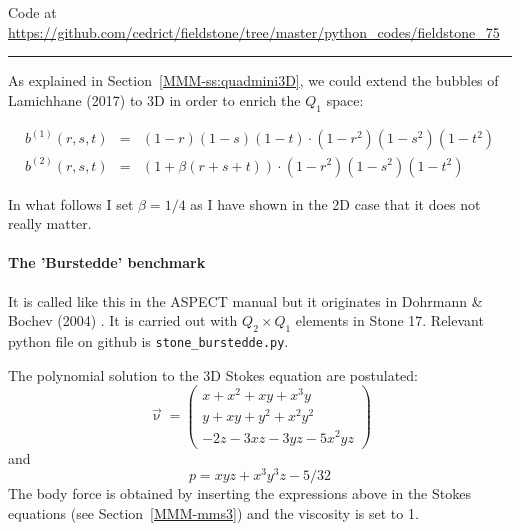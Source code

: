 

\begin{center}
Code at \url{https://github.com/cedrict/fieldstone/tree/master/python_codes/fieldstone_75}
\end{center}

\par\noindent\rule{\textwidth}{0.4pt}


As explained in Section~\ref{MMM-ss:quadmini3D}, we could extend the bubbles 
of Lamichhane (2017) \cite{lami17} to 3D in order to enrich the $Q_1$ space:

\begin{eqnarray}
b^{(1)} (r,s,t) &=& (1-r)(1-s)(1-t) \cdot (1-r^2) (1-s^2) (1-t^2) \\
b^{(2)} (r,s,t) &=& (1 + \beta(r+s+t)) \cdot (1-r^2) (1-s^2) (1-t^2) 
\end{eqnarray}

In what follows I set $\beta=1/4$ as I have shown in the 2D case that it does not really matter. 

\paragraph{The 'Burstedde' benchmark} It is called like this in the ASPECT manual 
but it originates in Dohrmann \& Bochev (2004) \cite{dobo04}. It is carried 
out with $Q_2 \times Q_1$ elements in Stone 17. 
Relevant python file on github is {\tt stone\_burstedde.py}.

The polynomial solution to the 3D Stokes equation are postulated:
\begin{equation}
\vec{\upnu}
=
\left(
\begin{array}{c}
x+x^2+xy+x^3y \\
y + xy + y^2 + x^2 y^2\\
-2z - 3xz - 3yz - 5x^2 yz
\end{array}
\right)
\end{equation}
and
\begin{equation}
p = xyz + x^3 y^3z - 5/32
\end{equation}
The body force is obtained by inserting the expressions above in the Stokes equations
(see Section~\ref{MMM-mms3}) and the viscosity is set to 1.

